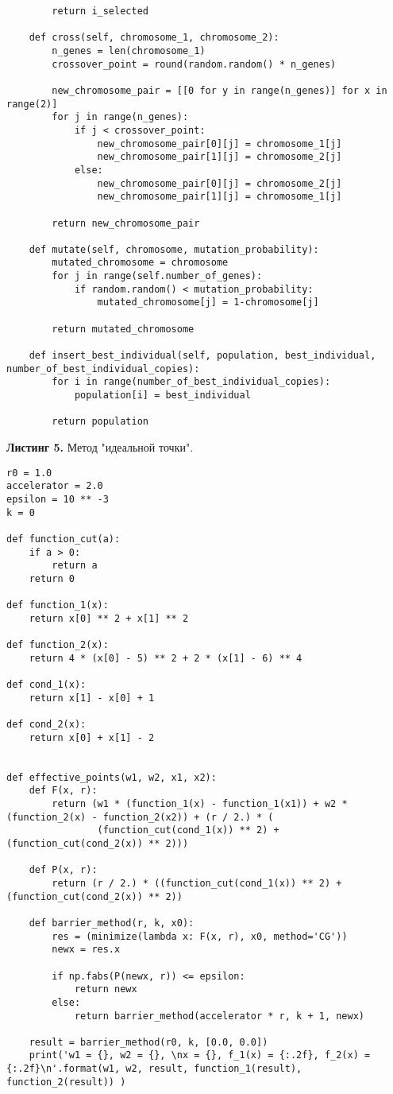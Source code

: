 \documentclass[a4paper, 12pt]{article}   	%
\begin{document}
\begin{verbatim}
		return i_selected

	def cross(self, chromosome_1, chromosome_2):
		n_genes = len(chromosome_1)
		crossover_point = round(random.random() * n_genes)

		new_chromosome_pair = [[0 for y in range(n_genes)] for x in range(2)]
		for j in range(n_genes):
			if j < crossover_point:
				new_chromosome_pair[0][j] = chromosome_1[j]
				new_chromosome_pair[1][j] = chromosome_2[j]
			else:
				new_chromosome_pair[0][j] = chromosome_2[j]
				new_chromosome_pair[1][j] = chromosome_1[j]

		return new_chromosome_pair

	def mutate(self, chromosome, mutation_probability):
		mutated_chromosome = chromosome
		for j in range(self.number_of_genes):
			if random.random() < mutation_probability:
				mutated_chromosome[j] = 1-chromosome[j]

		return mutated_chromosome

	def insert_best_individual(self, population, best_individual, number_of_best_individual_copies):
		for i in range(number_of_best_individual_copies):
			population[i] = best_individual

		return population
\end{verbatim}

    \textbf{Листинг 5.} Метод "идеальной точки".
    \begin{verbatim}
r0 = 1.0
accelerator = 2.0
epsilon = 10 ** -3
k = 0

def function_cut(a):
	if a > 0:
		return a
	return 0

def function_1(x):
	return x[0] ** 2 + x[1] ** 2

def function_2(x):
	return 4 * (x[0] - 5) ** 2 + 2 * (x[1] - 6) ** 4

def cond_1(x):
	return x[1] - x[0] + 1

def cond_2(x):
	return x[0] + x[1] - 2


def effective_points(w1, w2, x1, x2):
	def F(x, r):
		return (w1 * (function_1(x) - function_1(x1)) + w2 * (function_2(x) - function_2(x2)) + (r / 2.) * (
				(function_cut(cond_1(x)) ** 2) + (function_cut(cond_2(x)) ** 2)))

	def P(x, r):
		return (r / 2.) * ((function_cut(cond_1(x)) ** 2) + (function_cut(cond_2(x)) ** 2))

	def barrier_method(r, k, x0):
		res = (minimize(lambda x: F(x, r), x0, method='CG'))
		newx = res.x

		if np.fabs(P(newx, r)) <= epsilon:
			return newx
		else:
			return barrier_method(accelerator * r, k + 1, newx)

	result = barrier_method(r0, k, [0.0, 0.0])
	print('w1 = {}, w2 = {}, \nx = {}, f_1(x) = {:.2f}, f_2(x) = {:.2f}\n'.format(w1, w2, result, function_1(result), function_2(result)) )
    \end{verbatim}
\end{document}
